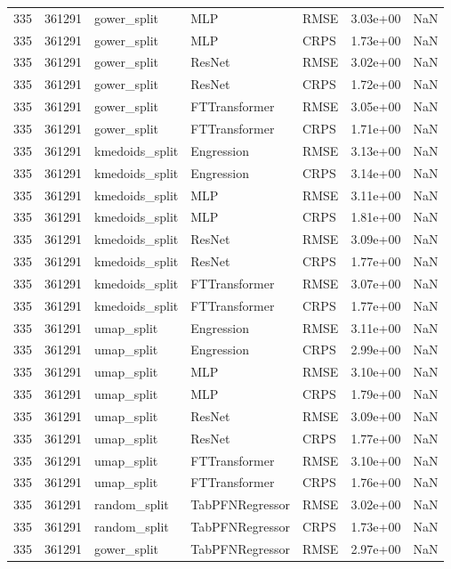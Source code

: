 \begin{tabular}{rrlllrr}
335 & 361291 & gower\_split & MLP & RMSE & 3.03e+00 & NaN \\
335 & 361291 & gower\_split & MLP & CRPS & 1.73e+00 & NaN \\
335 & 361291 & gower\_split & ResNet & RMSE & 3.02e+00 & NaN \\
335 & 361291 & gower\_split & ResNet & CRPS & 1.72e+00 & NaN \\
335 & 361291 & gower\_split & FTTransformer & RMSE & 3.05e+00 & NaN \\
335 & 361291 & gower\_split & FTTransformer & CRPS & 1.71e+00 & NaN \\
335 & 361291 & kmedoids\_split & Engression & RMSE & 3.13e+00 & NaN \\
335 & 361291 & kmedoids\_split & Engression & CRPS & 3.14e+00 & NaN \\
335 & 361291 & kmedoids\_split & MLP & RMSE & 3.11e+00 & NaN \\
335 & 361291 & kmedoids\_split & MLP & CRPS & 1.81e+00 & NaN \\
335 & 361291 & kmedoids\_split & ResNet & RMSE & 3.09e+00 & NaN \\
335 & 361291 & kmedoids\_split & ResNet & CRPS & 1.77e+00 & NaN \\
335 & 361291 & kmedoids\_split & FTTransformer & RMSE & 3.07e+00 & NaN \\
335 & 361291 & kmedoids\_split & FTTransformer & CRPS & 1.77e+00 & NaN \\
335 & 361291 & umap\_split & Engression & RMSE & 3.11e+00 & NaN \\
335 & 361291 & umap\_split & Engression & CRPS & 2.99e+00 & NaN \\
335 & 361291 & umap\_split & MLP & RMSE & 3.10e+00 & NaN \\
335 & 361291 & umap\_split & MLP & CRPS & 1.79e+00 & NaN \\
335 & 361291 & umap\_split & ResNet & RMSE & 3.09e+00 & NaN \\
335 & 361291 & umap\_split & ResNet & CRPS & 1.77e+00 & NaN \\
335 & 361291 & umap\_split & FTTransformer & RMSE & 3.10e+00 & NaN \\
335 & 361291 & umap\_split & FTTransformer & CRPS & 1.76e+00 & NaN \\
335 & 361291 & random\_split & TabPFNRegressor & RMSE & 3.02e+00 & NaN \\
335 & 361291 & random\_split & TabPFNRegressor & CRPS & 1.73e+00 & NaN \\
335 & 361291 & gower\_split & TabPFNRegressor & RMSE & 2.97e+00 & NaN \\

\end{tabular}
